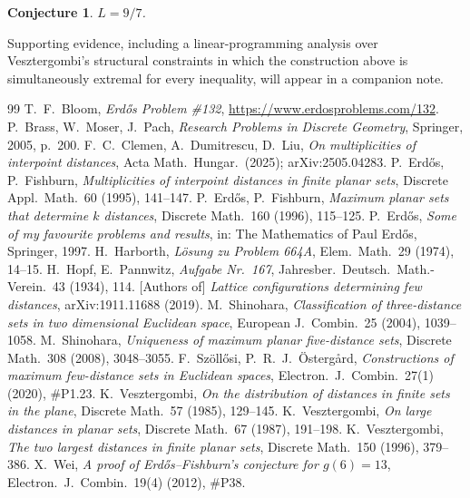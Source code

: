 \documentclass[11pt]{amsart}
\newtheorem{conjecture}[theorem]{Conjecture}
\begin{document}
\begin{conjecture}\label{conj:97}
$L=9/7$.
\end{conjecture}

Supporting evidence, including a linear-programming analysis over Vesztergombi's
structural constraints \cite{Ve85,Ve87,Ve96} in which the construction above is
simultaneously extremal for every inequality, will appear in a companion note.

\begin{thebibliography}{99}
 T.~F.~Bloom, \emph{Erd\H{o}s Problem \#132},
\url{https://www.erdosproblems.com/132}.
 P.~Brass, W.~Moser, J.~Pach, \emph{Research Problems in Discrete
Geometry}, Springer, 2005, p.~200.
 F.~C.~Clemen, A.~Dumitrescu, D.~Liu, \emph{On multiplicities of
interpoint distances}, Acta Math.\ Hungar.\ (2025); arXiv:2505.04283.
 P.~Erd\H{o}s, P.~Fishburn, \emph{Multiplicities of interpoint distances
in finite planar sets}, Discrete Appl.\ Math.\ 60 (1995), 141--147.
 P.~Erd\H{o}s, P.~Fishburn, \emph{Maximum planar sets that determine $k$
distances}, Discrete Math.\ 160 (1996), 115--125.
 P.~Erd\H{o}s, \emph{Some of my favourite problems and results}, in: The
Mathematics of Paul Erd\H{o}s, Springer, 1997.
 H.~Harborth, \emph{L\"osung zu Problem 664A}, Elem.\ Math.\ 29 (1974),
14--15.
 H.~Hopf, E.~Pannwitz, \emph{Aufgabe Nr.\ 167}, Jahresber.\ Deutsch.\
Math.-Verein.\ 43 (1934), 114.
 [Authors of] \emph{Lattice configurations determining few distances},
arXiv:1911.11688 (2019).
 M.~Shinohara, \emph{Classification of three-distance sets in two
dimensional Euclidean space}, European J.\ Combin.\ 25 (2004), 1039--1058.
\bibitem{Shi08} M.~Shinohara, \emph{Uniqueness of maximum planar five-distance sets},
Discrete Math.\ 308 (2008), 3048--3055.
 F.~Sz\"oll\H{o}si, P.~R.~J.~\"Osterg\aa rd, \emph{Constructions of
maximum few-distance sets in Euclidean spaces}, Electron.\ J.\ Combin.\ 27(1) (2020),
\#P1.23.
 K.~Vesztergombi, \emph{On the distribution of distances in finite sets
in the plane}, Discrete Math.\ 57 (1985), 129--145.
 K.~Vesztergombi, \emph{On large distances in planar sets}, Discrete
Math.\ 67 (1987), 191--198.
 K.~Vesztergombi, \emph{The two largest distances in finite planar
sets}, Discrete Math.\ 150 (1996), 379--386.
 X.~Wei, \emph{A proof of Erd\H{o}s--Fishburn's conjecture for
$g(6)=13$}, Electron.\ J.\ Combin.\ 19(4) (2012), \#P38.
\end{thebibliography}
\end{document}
